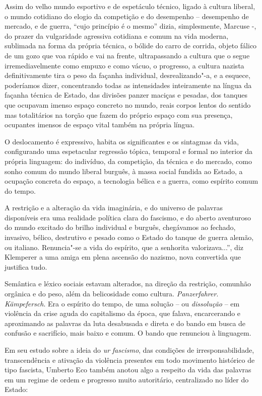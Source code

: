 Assim do velho mundo esportivo e de espetáculo técnico, ligado à cultura
liberal, o mundo cotidiano do elogio da competição e do desempenho --
desempenho de mercado, e de guerra, ``cujo princípio é o mesmo'' dizia,
simplesmente, Marcuse -, do prazer da vulgaridade agressiva cotidiana e
comum na vida moderna, sublimada na forma da própria técnica, o bólide
do carro de corrida, objeto fálico de um gozo que voa rápido e vai na
frente, ultrapassando a cultura que o segue irremediavelmente como
empuxo e como vácuo, o progresso, a cultura nazista definitivamente tira
o peso da façanha individual, desrealizando"-a, e a esquece, poderíamos
dizer, concentrando todas as intensidades inteiramente na língua da
façanha técnica de Estado, das divisões panzer maciças e pesadas, dos
tanques que ocupavam imenso espaço concreto no mundo, reais corpos
lentos do sentido mas totalitários na torção que fazem do próprio espaço
com sua presença, ocupantes imensos de espaço vital também na própria
língua.

O deslocamento é expressivo, habita os significantes e os sintagmas da
vida, configurando uma espetacular regressão tópica, temporal e formal
no interior da própria linguagem: do indivíduo, da competição, da
técnica e do mercado, como sonho comum do mundo liberal burguês, à massa
social fundida ao Estado, a ocupação concreta do espaço, a tecnologia
bélica e a guerra, como espírito comum do tempo.

A restrição e a alteração da vida imaginária, e do universo de palavras
disponíveis era uma realidade política clara do fascismo, e do aberto
aventuroso do mundo excitado do brilho individual e burguês, chegávamos
ao fechado, invasivo, bélico, destrutivo e pesado como o Estado do
tanque de guerra alemão, ou italiano. Renuncia"-se a vida do espírito,
que a senhorita valorizava...'', diz Klemperer a uma amiga em plena
ascensão do nazismo, nova convertida que justifica tudo.

Semântica e léxico sociais estavam alterados, na direção da restrição,
comunhão orgânica e do peso, além da belicosidade como cultura.
\emph{Panzerfahrer}. \emph{Kämpefersch}. Era o espírito do tempo, de uma
solução -- ou \emph{dissolução} -- em violência da crise aguda do
capitalismo da época, que falava, encarcerando e aproximando as palavras
da luta desabusada e direta e do bando em busca de confusão e
sacrifício, mais baixo e comum. O bando que renunciou à linguagem.

Em seu estudo sobre a ideia do \emph{ur} \emph{fascismo}, das condições
de irresponsabilidade, transcendência e ativação da violência presentes
em todo movimento histórico de tipo fascista, Umberto Eco também anotou
algo a respeito da vida das palavras em um regime de ordem e progresso
muito autoritário, centralizado no líder do Estado:

